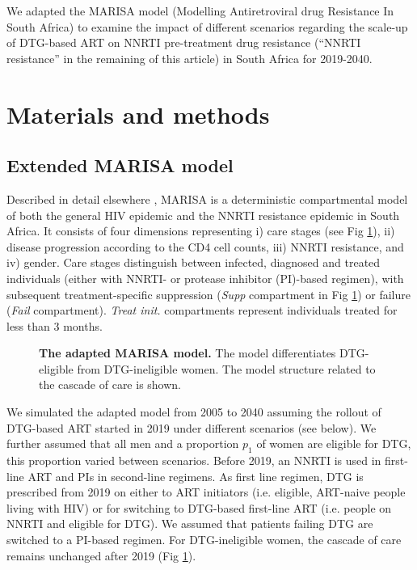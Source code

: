 \documentclass[10pt,letterpaper]{article}
\begin{document}
We adapted the MARISA model (Modelling Antiretroviral drug Resistance In South Africa) \cite{Hauser2019} to examine the impact of different scenarios regarding the scale-up of DTG-based ART on NNRTI pre-treatment drug resistance (“NNRTI resistance” in the remaining of this article) in South Africa for 2019-2040.

\section*{Materials and methods}
\subsection*{Extended MARISA model}
Described in detail elsewhere \cite{Hauser2019}, MARISA is a deterministic compartmental model of both the general HIV epidemic and the NNRTI resistance epidemic in South Africa. It consists of four dimensions representing i) care stages (see Fig \ref{fig1}), ii) disease progression according to the CD4 cell counts, iii) NNRTI resistance, and iv) gender. Care stages distinguish between infected, diagnosed and treated individuals (either with NNRTI- or protease inhibitor (PI)-based regimen), with subsequent treatment-specific suppression (\textit{Supp} compartment in Fig \ref{fig1}) or failure (\textit{Fail} compartment). \textit{Treat init.} compartments represent individuals treated for less than 3 months.

\begin{figure}[h]
   \vspace{0.5cm}
   \caption{{\bf The adapted MARISA model.}
The model differentiates DTG-eligible from DTG-ineligible women. The model structure related to the cascade of care is shown.}\label{fig1}
\end{figure}

We simulated the adapted model from 2005 to 2040 assuming the rollout of DTG-based ART started in 2019 under different scenarios (see below). We further assumed that all men and a proportion $p_1$ of women are eligible for DTG, this proportion varied between scenarios. Before 2019, an NNRTI is used in first-line ART and PIs in second-line regimens. As first line regimen,  DTG is prescribed from 2019 on either to ART initiators (i.e. eligible, ART-naive people living with HIV) or for switching to DTG-based first-line ART (i.e. people on NNRTI and eligible for DTG). We assumed that patients failing DTG are switched to a PI-based regimen. For DTG-ineligible women, the cascade of care remains unchanged after 2019 (Fig \ref{fig1}).
\end{document}
